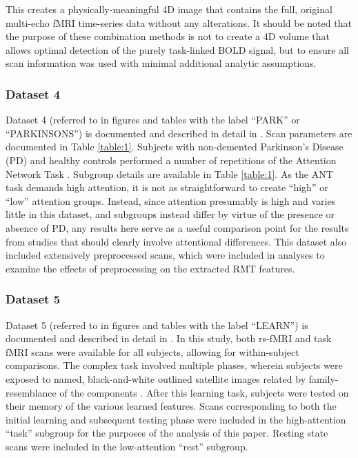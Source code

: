 \documentclass[NETN,manuscript]{stjour-new}
\begin{document}
This creates a physically-meaningful 4D image that contains the full, original multi-echo fMRI
time-series data without any alterations. It should be noted that the purpose of these combination
methods is not to create a 4D volume that allows optimal detection of the purely task-linked BOLD
signal, but to ensure all scan information was used with minimal additional analytic assumptions.

\subsubsection{Dataset 4}
Dataset 4 (referred to in figures and tables with the label ``PARK'' or ``PARKINSONS'') is documented and
described in detail in \cite{madhyasthaDynamicConnectivityRest2015}. Scan parameters are documented
in Table \ref{table:1}. Subjects with non-demented Parkinson’s Disease (PD) and healthy controls performed a
number of repetitions of the Attention Network Task
\citep[ANT;][]{fanActivationAttentionalNetworks2005}. Subgroup details are available in Table \ref{table:1}. As the ANT
task demands high attention, it is not as straightforward to create ``high'' or ``low'' attention
groups. Instead, since attention presumably is high and varies little in this dataset, and subgroups
instead differ by virtue of the presence or absence of PD, any results here serve as a useful
comparison point for the results from studies that should clearly involve attentional differences.
This dataset also included extensively preprocessed scans, which were included in analyses to
examine the effects of preprocessing on the extracted RMT features.

\subsubsection{Dataset 5}
Dataset 5 (referred to in figures and tables with the label ``LEARN'') is documented and described in
detail in \cite{schapiroHumanHippocampalReplay2018}. In this study, both rs-fMRI and task fMRI scans
were available for all subjects, allowing for within-subject comparisons. The complex task involved
multiple phases, wherein subjects were exposed to named, black-and-white outlined satellite images
related by family-resemblance of the components \citep[see figure 1
of][]{schapiroHumanHippocampalReplay2018}. After this learning task, subjects were tested on their
memory of the various learned features. Scans corresponding to both the initial learning and
subsequent testing phase were included in the high-attention ``task'' subgroup for the purposes of
the analysis of this paper. Resting state scans were included in the low-attention ``rest''
subgroup.
\end{document}
